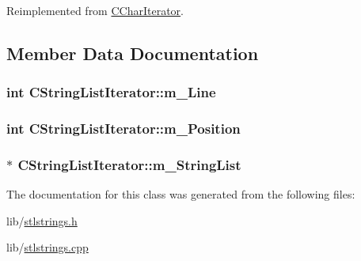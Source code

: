Reimplemented from \hyperlink{classCCharIterator_a0bb27af4d399d1104a0ac630dad15551}{C\-Char\-Iterator}.



\subsection{Member Data Documentation}
\hypertarget{classCStringListIterator_adc98c30b44daa3d0b2e632a894269535}{
\subsubsection[{m\-\_\-\-Line}]{\setlength{\rightskip}{0pt plus 5cm}int C\-String\-List\-Iterator\-::m\-\_\-\-Line\hspace{0.3cm}{\ttfamily [protected]}}}\label{classCStringListIterator_adc98c30b44daa3d0b2e632a894269535}
\hypertarget{classCStringListIterator_a6d205aacb48beb07889cf6f5a74176a9}{
\subsubsection[{m\-\_\-\-Position}]{\setlength{\rightskip}{0pt plus 5cm}int C\-String\-List\-Iterator\-::m\-\_\-\-Position\hspace{0.3cm}{\ttfamily [protected]}}}\label{classCStringListIterator_a6d205aacb48beb07889cf6f5a74176a9}
\hypertarget{classCStringListIterator_ad0f2e00e0d0a89c8465b4e5aa0f717b9}{
\subsubsection[{m\-\_\-\-String\-List}]{$\ast$ C\-String\-List\-Iterator\-::m\-\_\-\-String\-List\hspace{0.3cm}{\ttfamily [protected]}}}\label{classCStringListIterator_ad0f2e00e0d0a89c8465b4e5aa0f717b9}


The documentation for this class was generated from the following files\-:\begin{DoxyCompactItemize}
\item 
lib/\hyperlink{stlstrings_8h}{stlstrings.\-h}\item 
lib/\hyperlink{stlstrings_8cpp}{stlstrings.\-cpp}\end{DoxyCompactItemize}
